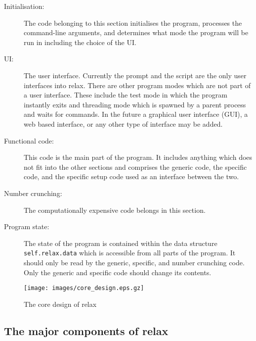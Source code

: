 \begin{description}
\item[Initialisation:]  The code belonging to this section initialises the program, processes the command-line arguments, and determines what mode the program will be run in including the choice of the UI.

\item[UI:]  The user interface.  Currently the prompt and the script are the only user interfaces into relax.  There are other program modes which are not part of a user interface.  These include the test mode in which the program instantly exits and threading mode which is spawned by a parent process and waits for commands.  In the future a graphical user interface (GUI), a web based interface, or any other type of interface may be added.

\item[Functional code:]  This code is the main part of the program.  It includes anything which does not fit into the other sections and comprises the generic code, the specific code, and the specific setup code used as an interface between the two.

\item[Number crunching:]  The computationally expensive code belongs in this section.

\item[Program state:]  The state of the program is contained within the data structure \texttt{self.relax.data} which is accessible from all parts of the program.  It should only be read by the generic, specific, and number crunching code.  Only the generic and specific code should change its contents.
\end{description}

\begin{figure}
\centerline{\texttt{[image: images/core\_design.eps.gz]}}
\caption{The core design of relax} \label{fig: core design}
\end{figure}



\subsection{The major components of relax}

